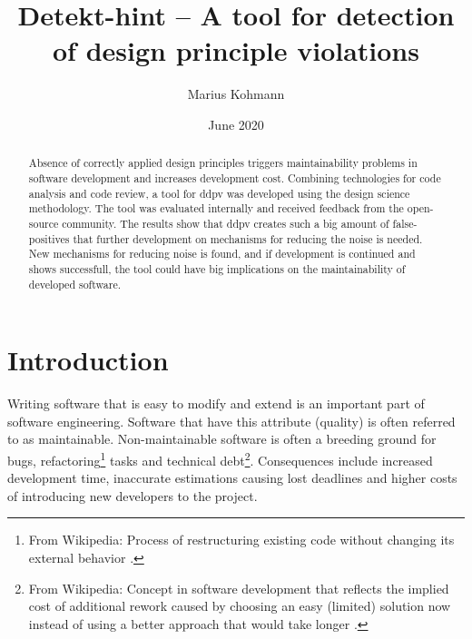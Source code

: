 \documentclass{report}
\title{Detekt-hint -- A tool for detection of design principle violations}
\author{Marius Kohmann}
\date{June 2020}
\begin{document}
\maketitle

\begin{abstract}
	Absence of correctly applied design principles triggers maintainability problems in software development and increases development cost. Combining technologies for code analysis and code review, a tool for \gls{ddpv} was developed using the design science methodology. The tool was evaluated internally and received feedback from the open-source community. The results show that \gls{ddpv} creates such a big amount of false-positives that further development on mechanisms for reducing the noise is needed. New mechanisms for reducing noise is found, and if
	development is continued and shows successfull, the tool could have big implications on the maintainability of developed software.
	
\end{abstract}


\clearpage
\tableofcontents
\clearpage
\chapter{Introduction}




Writing software that is easy to modify and extend is an important part of software engineering. Software that have this attribute (quality) is often referred to as maintainable. Non-maintainable software is often a breeding ground for bugs, refactoring\footnote{From Wikipedia: Process of restructuring existing code without changing its external behavior \cite{refactoring}.} tasks and technical debt\footnote{From Wikipedia: Concept in software development that reflects the implied cost of additional rework caused by choosing an easy (limited) solution now instead of using a better approach that would take longer \cite{technicalDebt}.}. Consequences include increased development time, inaccurate estimations causing lost deadlines and higher costs of introducing new developers to the project.
\end{document}
